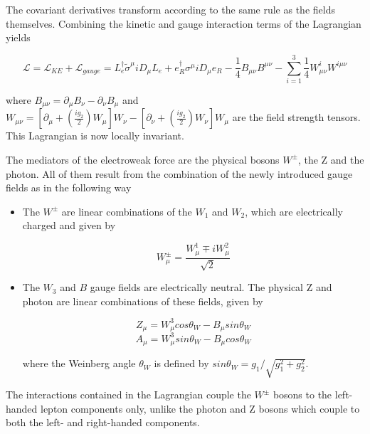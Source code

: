  The covariant derivatives transform according to the same rule as the fields themselves. Combining the kinetic and gauge interaction terms of the Lagrangian yields

 \begin{equation}
 \mathcal{L} = \mathcal{L}_{KE} + \mathcal{L}_{gauge}= L_{e}^{\dagger}\tilde{\sigma}^{\mu}iD_{\mu}L_{e}+e_{R}^{\dagger}\sigma^{\mu}iD_{\mu}e_{R} - \frac{1}{4}B_{\mu\nu}B^{\mu\nu}- \sum_{i=1}^{3}\frac{1}{4}W_{\mu\nu}^{i}W^{i\mu\nu}
 \end{equation}

 where $B_{\mu\nu}=\partial_{\mu}B_{\nu}-\partial_{\nu}B_{\mu}$ and $W_{\mu\nu} = [\partial_{\mu}+(\frac{ig_{2}}{2})W_{\mu}]W_{\nu} - [\partial_{\nu}+(\frac{ig_{2}}{2})W_{\nu}]W_{\mu}$ are the field strength tensors. This Lagrangian is now locally invariant.

 The mediators of the electroweak force are the physical bosons $W^{\pm}$, the Z and the photon. All of them result from the combination of the newly introduced gauge fields as in the following way

 \begin{itemize}

	 \item The $W^{\pm}$ are linear combinations of the $W_{1}$ and $W_{2}$, which are electrically charged and given by

	 \begin{equation}
		W_{\mu}^{\pm} = \frac{W_{\mu}^{1}\mp i W_{\mu}^{2}}{\sqrt{2}}
	\end{equation}

	\item The $W_{3}$ and $B$ gauge fields are electrically neutral. The physical Z and photon are linear combinations of these fields, given by

	\begin{equation}
	Z_{\mu} = W_{\mu}^{3}cos\theta_{W} - B_{\mu}sin\theta_{W}
	\end{equation}
	\begin{equation}
	A_{\mu} = W_{\mu}^{3}sin\theta_{W} - B_{\mu}cos\theta_{W}
	\end{equation}

	where the Weinberg angle $\theta_{W}$ is defined by $sin\theta_{W}= g_{1}/\sqrt{g_{1}^{2}+g_{2}^{2}}$.

\end{itemize}

The interactions contained in the Lagrangian couple the $W^{\pm}$ bosons to the left-handed lepton components only, unlike the photon and Z bosons which couple to both the left- and right-handed components. 

